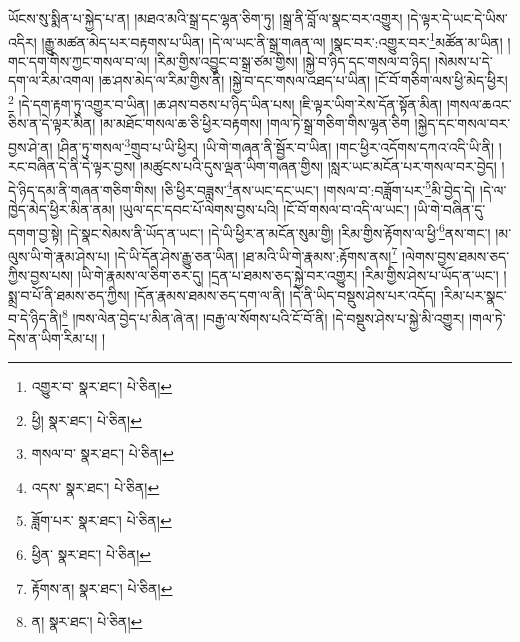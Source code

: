 ཡོངས་སུ་སྨིན་པ་སྐྱེད་པ་ན། །མཐའ་མའི་སྒྲ་དང་ལྷན་ཅིག་ཏུ། །སྒྲ་ནི་བློ་ལ་སྣང་བར་འགྱུར། །དེ་ལྟར་དེ་ཡང་དེ་ཡིས་འདིར། །རྒྱུ་མཚན་མེད་པར་བརྟགས་པ་ཡིན། །དེ་ལ་ཡང་ནི་སྒྲ་གཞན་ལ། །སྣང་བར་:འགྱུར་བར་\footnote{འགྱུར་བ་  སྣར་ཐང་།  པེ་ཅིན། }མཚོན་མ་ཡིན། །གང་དག་གིས་ཀྱང་གསལ་བ་ལ། །རིམ་གྱིས་འབྱུང་བ་སྒྲ་ཙམ་གྱིས། །སྐྱེ་བ་ཉིད་དང་གསལ་བ་ཉིད། །སེམས་པ་དེ་དག་ལ་རིམ་འགལ། །ཆ་ཤས་མེད་ལ་རིམ་གྱིས་ནི། །སྐྱེ་བ་དང་གསལ་འཐད་པ་ཡིན། །ངོ་བོ་གཅིག་ལས་ཕྱི་མེད་ཕྱིར།\footnote{ཕྱི།  སྣར་ཐང་།  པེ་ཅིན། } །དེ་དག་རྟག་ཏུ་འགྱུར་བ་ཡིན། །ཆ་ཤས་བཅས་པ་ཉིད་ཡིན་པས། །ཇི་ལྟར་ཡིག་རེས་དོན་སྟོན་མིན། །གསལ་ཆའང་ཅིས་ན་དེ་ལྟར་མིན། །མ་མཐོང་གསལ་ཆ་ཅི་ཕྱིར་བརྟགས། །གལ་ཏེ་སྒྲ་གཅིག་གིས་ལྷན་ཅིག །སྐྱེད་དང་གསལ་བར་བྱས་ཤེ་ན། །ཤིན་ཏུ་གསལ་\footnote{གསལ་བ་  སྣར་ཐང་།  པེ་ཅིན། }གྲུབ་པ་ཡི་ཕྱིར། །ཡི་གེ་གཞན་ནི་སྦྱོར་བ་ཡིན། །གང་ཕྱིར་འདོགས་དཀའ་འདི་ཡི་ནི། །རང་བཞིན་དེ་ནི་དེ་ལྟར་བྱས། །མཚུངས་པའི་དུས་ལྡན་ཡིག་གཞན་གྱིས། །སླར་ཡང་མངོན་པར་གསལ་བར་བྱེད། །དེ་ཉིད་དམ་ནི་གཞན་གཅིག་གིས། །ཅི་ཕྱིར་བཟླས་\footnote{འདས་  སྣར་ཐང་།  པེ་ཅིན། }ནས་ཡང་དང་ཡང་། །གསལ་བ་:བཟློག་པར་\footnote{ཟློག་པར་  སྣར་ཐང་།  པེ་ཅིན། }མི་བྱེད་དེ། །དེ་ལ་ཁྱེད་མེད་ཕྱིར་མིན་ནམ། །ཡུལ་དང་དབང་པོ་ལེགས་བྱས་པའི། །ངོ་བོ་གསལ་བ་འདི་ལ་ཡང་། །ཡི་གེ་བཞིན་དུ་དགག་བྱ་སྟེ། །དེ་སྣང་སེམས་ནི་ཡོད་ན་ཡང་། །དེ་ཡི་ཕྱིར་ན་མངོན་སུམ་གྱི། །རིམ་གྱིས་རྟོགས་ལ་ཕྱི་\footnote{ཕྱིན་  སྣར་ཐང་།  པེ་ཅིན། }ནས་གང་། །མ་ལུས་ཡི་གེ་རྣམ་ཤེས་པ། །དེ་ཡི་དོན་ཤེས་རྒྱུ་ཅན་ཡིན། །ཐ་མའི་ཡི་གེ་རྣམས་:རྟོགས་ནས།\footnote{རྟོགས་ན།  སྣར་ཐང་།  པེ་ཅིན། } །ལེགས་བྱས་ཐམས་ཅད་ཀྱིས་བྱས་པས། །ཡི་གེ་རྣམས་ལ་ཅིག་ཅར་དུ། །དྲན་པ་ཐམས་ཅད་སྐྱེ་བར་འགྱུར། །རིམ་གྱིས་ཤེས་པ་ཡོད་ན་ཡང་། །སྨྲ་བ་པོ་ནི་ཐམས་ཅད་ཀྱིས། །དོན་རྣམས་ཐམས་ཅད་དག་ལ་ནི། །དེ་ནི་ཡིད་བསྡུས་ཤེས་པར་འདོད། །རིམ་པར་སྣང་བ་དེ་ཉིད་ནི།\footnote{ན།  སྣར་ཐང་།  པེ་ཅིན། } །ཁས་ལེན་བྱེད་པ་མིན་ཞེ་ན། །བརྒྱ་ལ་སོགས་པའི་ངོ་བོ་ནི། །དེ་བསྡུས་ཤེས་པ་སྐྱེ་མི་འགྱུར། །གལ་ཏེ་དེས་ན་ཡིག་རིམ་པ། །
